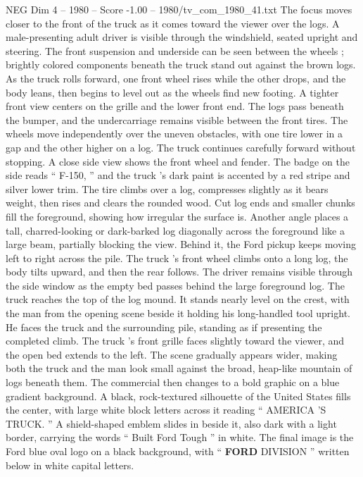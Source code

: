 \begin{textsample}{NEG Dim 4 – 1980 – Score -1.00 – 1980/tv\_com\_1980\_41.txt}
The focus moves closer to the front of the truck as it comes toward the viewer over the logs.
A male-presenting adult driver is visible through the windshield, seated upright and steering.
The front suspension and underside can be seen between the wheels ; brightly colored components beneath the truck stand out against the brown logs.
As the truck rolls forward, one front wheel rises while the other drops, and the body leans, then begins to level out as the wheels find new footing.
A tighter front view centers on the grille and the lower front end.
The logs pass beneath the bumper, and the undercarriage remains visible between the front tires.
The wheels move independently over the uneven obstacles, with one tire lower in a gap and the other higher on a log.
The truck continues carefully forward without stopping.
A close side view shows the front wheel and fender.
The badge on the side reads “ F-150, ” and the truck ’s dark paint is accented by a red stripe and silver lower trim.
The tire climbs over a log, compresses slightly as it bears weight, then rises and clears the rounded wood.
Cut log ends and smaller chunks fill the foreground, showing how irregular the surface is.
Another angle places a tall, charred-looking or dark-barked log diagonally across the foreground like a large beam, partially blocking the view.
Behind it, the Ford pickup keeps moving left to right across the pile.
The truck ’s front wheel climbs onto a long log, the body tilts upward, and then the rear follows.
The driver remains visible through the side window as the empty bed passes behind the large foreground log.
The truck reaches the top of the log mound.
It stands nearly level on the crest, with the man from the opening scene beside it holding his long-handled tool upright.
He faces the truck and the surrounding pile, standing as if presenting the completed climb.
The truck ’s front grille faces slightly toward the viewer, and the open bed extends to the left.
The scene gradually appears wider, making both the truck and the man look small against the broad, heap-like mountain of logs beneath them.
The commercial then changes to a bold graphic on a blue gradient background.
A black, rock-textured silhouette of the United States fills the center, with large white block letters across it reading “ AMERICA ’S TRUCK. ” A shield-shaped emblem slides in beside it, also dark with a light border, carrying the words “ Built Ford Tough ” in white.
The final image is the Ford blue oval logo on a black background, with “ \textbf{FORD} DIVISION ” written below in white capital letters.

\end{textsample}
